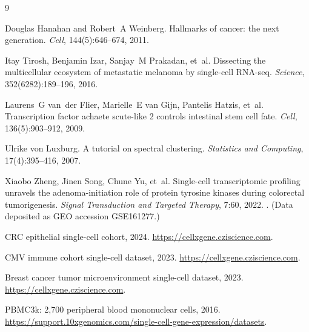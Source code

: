 \documentclass{article}
\begin{document}
\clearpage
\begin{thebibliography}{9}

Douglas Hanahan and Robert~A Weinberg.
\newblock Hallmarks of cancer: the next generation.
\newblock \emph{Cell}, 144(5):646--674, 2011.

Itay Tirosh, Benjamin Izar, Sanjay~M Prakadan, et~al.
\newblock Dissecting the multicellular ecosystem of metastatic melanoma by single-cell {RNA}-seq.
\newblock \emph{Science}, 352(6282):189--196, 2016.

Laurens~G van~der Flier, Marielle~E van Gijn, Pantelis Hatzis, et~al.
\newblock Transcription factor achaete scute-like 2 controls intestinal stem cell fate.
\newblock \emph{Cell}, 136(5):903--912, 2009.

Ulrike von Luxburg.
\newblock A tutorial on spectral clustering.
\newblock \emph{Statistics and Computing}, 17(4):395--416, 2007.

Xiaobo Zheng, Jinen Song, Chune Yu, et~al.
\newblock Single-cell transcriptomic profiling unravels the adenoma-initiation
  role of protein tyrosine kinases during colorectal tumorigenesis.
\newblock \emph{Signal Transduction and Targeted Therapy}, 7:60, 2022.
\newblock {}. (Data deposited as GEO accession GSE161277.)

{CRC} epithelial single-cell cohort, 2024.
\newblock \url{https://cellxgene.cziscience.com}.

{CMV} immune cohort single-cell dataset, 2023.
\newblock \url{https://cellxgene.cziscience.com}.

Breast cancer tumor microenvironment single-cell dataset, 2023.
\newblock \url{https://cellxgene.cziscience.com}.

{PBMC3k}: 2,700 peripheral blood mononuclear cells, 2016.
\newblock \url{https://support.10xgenomics.com/single-cell-gene-expression/datasets}.

\end{thebibliography}
\end{document}
